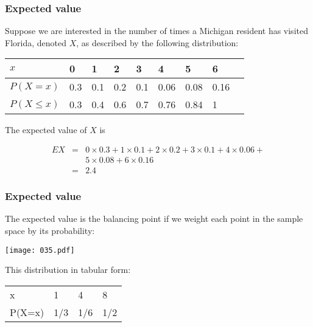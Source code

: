 \begin{frame}
\frametitle{Expected value}

Suppose we are interested in the number of times a Michigan resident
has visited Florida, denoted $X$, as described by the following
distribution:

\begin{center}
\begin{tabular}{lllllllll}
$x$         & 0   & 1 & 2 & 3 & 4 & 5 & 6\\\hline
$P(X=x)$    & 0.3 & 0.1 & 0.2 & 0.1 & 0.06 & 0.08 & 0.16\\
$P(X\le x)$ & 0.3 & 0.4 & 0.6 & 0.7 & 0.76 & 0.84 & 1\\\hline
\end{tabular}
\end{center}

The expected value of $X$ is

\begin{eqnarray*}
EX &=& 0\times 0.3 + 1\times 0.1 + 2\times 0.2 + 3\times 0.1 +
4\times 0.06 +\\&& 5\times 0.08 + 6\times 0.16\\
&=& 2.4
\end{eqnarray*}

\end{frame}

\begin{frame}
\frametitle{Expected value}

The expected value is the balancing point if we weight each point in
the sample space by its probability:

\begin{center}
\texttt{[image: 035.pdf]}
\end{center}

This distribution in tabular form:

\begin{center}
\begin{tabular}{llll}\hline
x      & 1 & 4 & 8\\
P(X=x) & 1/3 & 1/6 & 1/2\\\hline
\end{tabular}
\end{center}

\end{frame}

%
%
%
%
%

